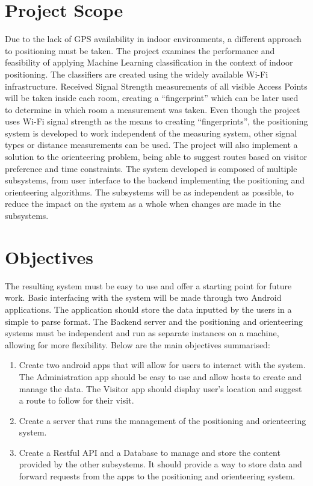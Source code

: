 \documentclass[12pt]{informatics-report}
\begin{document}
\section{Project Scope}
Due to the lack of GPS availability in indoor environments, a different approach to positioning must be taken. The project examines the performance and feasibility of applying Machine Learning classification in the context of indoor positioning. The classifiers are created using the widely available Wi-Fi infrastructure. Received Signal Strength measurements of all visible Access Points will be taken inside each room, creating a “fingerprint” which can be later used to determine in which room a measurement was taken. Even though the project uses Wi-Fi signal strength as the means to creating “fingerprints”, the positioning system is developed to work independent of the measuring system, other signal types or distance measurements can be used.
The project will also implement a solution to the orienteering problem, being able to suggest routes based on visitor preference and time constraints.
The system developed is composed of multiple subsystems, from user interface to the backend implementing the positioning and orienteering algorithms. The subsystems will be as independent as possible, to reduce the impact on the system as a whole when changes are made in the subsystems.

\section{Objectives}
The resulting system must be easy to use and offer a starting point for future work. Basic interfacing with the system will be made through two Android applications. The application should store the data inputted by the users in a simple to parse format. The Backend server and the positioning and orienteering systems must be independent and run as separate instances on a machine, allowing for more flexibility.
Below are the main objectives summarised:
\begin{enumerate}
\item Create two android apps that will allow for users to interact with the system. The Administration app should be easy to use and allow hosts to create and manage the data. The Visitor app should display user’s location and suggest a route to follow for their visit.
\item Create a server that runs the management of the positioning and orienteering system.
\item Create a Restful API and a Database to manage and store the content provided by the other subsystems. It should provide a way to store data and forward requests from the apps to the positioning and orienteering system.
\end{enumerate}
\end{document}
